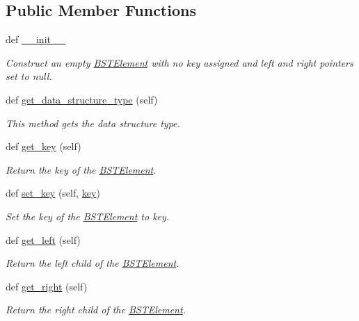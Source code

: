 \subsection*{Public Member Functions}
\begin{DoxyCompactItemize}
\item 
def \hyperlink{classbridges_1_1bst__element_1_1_b_s_t_element_a587f331c29a5f6f461399148b21a32e2}{\+\_\+\+\_\+init\+\_\+\+\_\+}
\begin{DoxyCompactList}\small\item\em Construct an empty \hyperlink{classbridges_1_1bst__element_1_1_b_s_t_element}{B\+S\+T\+Element} with no key assigned and left and right pointers set to null. \end{DoxyCompactList}\item 
def \hyperlink{classbridges_1_1bst__element_1_1_b_s_t_element_ad6763a7381b91e16d9dc927a6f501c81}{get\+\_\+data\+\_\+structure\+\_\+type} (self)
\begin{DoxyCompactList}\small\item\em This method gets the data structure type. \end{DoxyCompactList}\item 
def \hyperlink{classbridges_1_1bst__element_1_1_b_s_t_element_a55d8b35bbb309683c3643325749cbf30}{get\+\_\+key} (self)
\begin{DoxyCompactList}\small\item\em Return the key of the \hyperlink{classbridges_1_1bst__element_1_1_b_s_t_element}{B\+S\+T\+Element}. \end{DoxyCompactList}\item 
def \hyperlink{classbridges_1_1bst__element_1_1_b_s_t_element_a426506dad61594f1a581e599f3944feb}{set\+\_\+key} (self, \hyperlink{classbridges_1_1bst__element_1_1_b_s_t_element_a4b0e38f930804e26f5609c0130b63ddf}{key})
\begin{DoxyCompactList}\small\item\em Set the key of the \hyperlink{classbridges_1_1bst__element_1_1_b_s_t_element}{B\+S\+T\+Element} to key. \end{DoxyCompactList}\item 
def \hyperlink{classbridges_1_1bst__element_1_1_b_s_t_element_a3f5220af41a00cc6d24d0c592caabbb0}{get\+\_\+left} (self)
\begin{DoxyCompactList}\small\item\em Return the left child of the \hyperlink{classbridges_1_1bst__element_1_1_b_s_t_element}{B\+S\+T\+Element}. \end{DoxyCompactList}\item 
def \hyperlink{classbridges_1_1bst__element_1_1_b_s_t_element_a63873a4e910831c2581658847d14836c}{get\+\_\+right} (self)
\begin{DoxyCompactList}\small\item\em Return the right child of the \hyperlink{classbridges_1_1bst__element_1_1_b_s_t_element}{B\+S\+T\+Element}. \end{DoxyCompactList}\end{DoxyCompactItemize}
